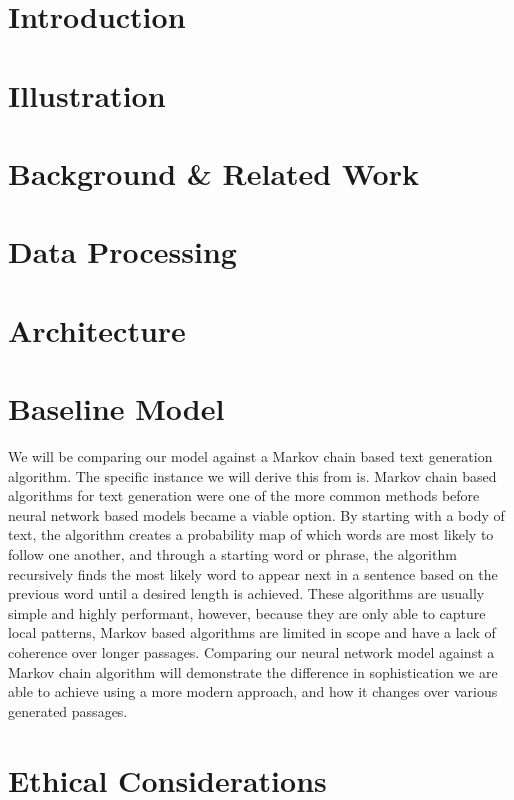 \documentclass{article} %
\begin{document}
\section{Introduction}


\section{Illustration}


\section{Background \& Related Work}


\section{Data Processing}


\section{Architecture}


\section{Baseline Model}

We will be comparing our model against a Markov chain based text generation algorithm. The specific instance we will derive this from is.
Markov chain based algorithms for text generation were one of the more common methods before neural network based models became a viable option. By starting with a body of text, the algorithm creates a probability map of which words are most likely to follow one another, and through a starting word or phrase, the algorithm recursively finds the most likely word to appear next in a sentence based on the previous word until a desired length is achieved. These algorithms are usually simple and highly performant, however, because they are only able to capture local patterns, Markov based algorithms are limited in scope and have a lack of coherence over longer passages. Comparing our neural network model against a Markov chain algorithm will demonstrate the difference in sophistication we are able to achieve using a more modern approach, and how it changes over various generated passages.


\section{Ethical Considerations}
\end{document}
